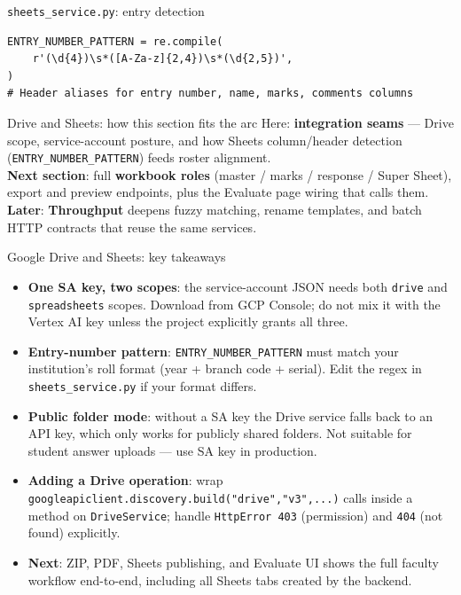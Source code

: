 \documentclass[aspectratio=169]{beamer}
\begin{document}
\begin{frame}[fragile]{\texttt{sheets\_service.py}: entry detection}
\begin{lstlisting}[style=py]
ENTRY_NUMBER_PATTERN = re.compile(
    r'(\d{4})\s*([A-Za-z]{2,4})\s*(\d{2,5})',
)
# Header aliases for entry number, name, marks, comments columns
\end{lstlisting}
\end{frame}

\begin{frame}{Drive and Sheets: how this section fits the arc}
  \small
  Here: \textbf{integration seams} --- Drive scope, service-account posture, and how Sheets column/header detection (\texttt{ENTRY\_NUMBER\_PATTERN}) feeds roster alignment.\\
  \textbf{Next section}: full \textbf{workbook roles} (master / marks / response / Super Sheet), export and preview endpoints, plus the Evaluate page wiring that calls them.\\
  \textbf{Later}: \textbf{Throughput} deepens fuzzy matching, rename templates, and batch HTTP contracts that reuse the same services.
\end{frame}

\begin{frame}{Google Drive and Sheets: key takeaways}
  \small
  \begin{itemize}\setlength\itemsep{0.3em}
    \item \textbf{One SA key, two scopes}: the service-account JSON needs both \texttt{drive} and \texttt{spreadsheets} scopes. Download from GCP Console; do not mix it with the Vertex AI key unless the project explicitly grants all three.
    \item \textbf{Entry-number pattern}: \texttt{ENTRY\_NUMBER\_PATTERN} must match your institution's roll format (year + branch code + serial). Edit the regex in \texttt{sheets\_service.py} if your format differs.
    \item \textbf{Public folder mode}: without a SA key the Drive service falls back to an API key, which only works for publicly shared folders. Not suitable for student answer uploads --- use SA key in production.
    \item \textbf{Adding a Drive operation}: wrap \texttt{googleapiclient.discovery.build("drive","v3",...)} calls inside a method on \texttt{DriveService}; handle \texttt{HttpError 403} (permission) and \texttt{404} (not found) explicitly.
    \item \textbf{Next}: ZIP, PDF, Sheets publishing, and Evaluate UI shows the full faculty workflow end-to-end, including all Sheets tabs created by the backend.
  \end{itemize}
\end{frame}
\end{document}
